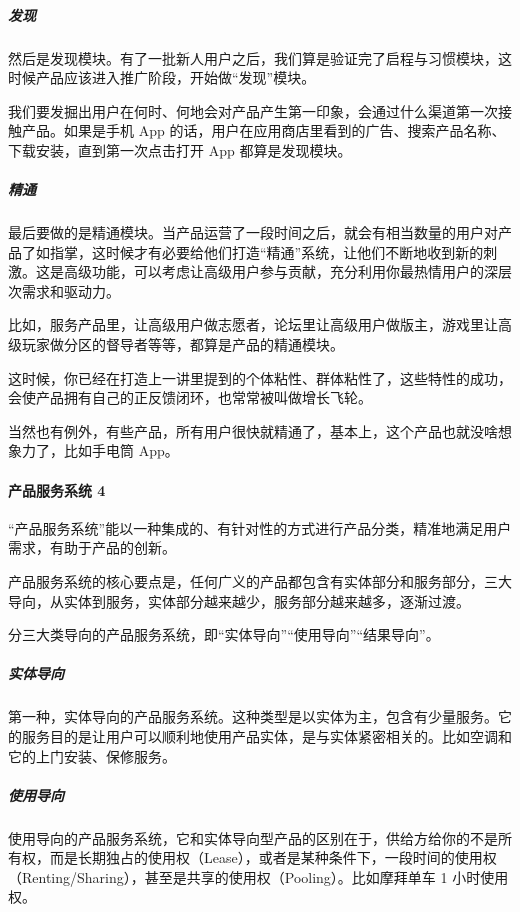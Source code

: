 \documentclass[letterpaper,11pt,english]{sphinxmanual}
\begin{document}
\subparagraph{发现}
\label{\detokenize{chapter_introduction/Product:id23}}
然后是发现模块。有了一批新人用户之后，我们算是验证完了启程与习惯模块，这时候产品应该进入推广阶段，开始做“发现”模块。

我们要发掘出用户在何时、何地会对产品产生第一印象，会通过什么渠道第一次接触产品。如果是手机
App
的话，用户在应用商店里看到的广告、搜索产品名称、下载安装，直到第一次点击打开
App 都算是发现模块。


\subparagraph{精通}
\label{\detokenize{chapter_introduction/Product:id24}}
最后要做的是精通模块。当产品运营了一段时间之后，就会有相当数量的用户对产品了如指掌，这时候才有必要给他们打造“精通”系统，让他们不断地收到新的刺激。这是高级功能，可以考虑让高级用户参与贡献，充分利用你最热情用户的深层次需求和驱动力。

比如，服务产品里，让高级用户做志愿者，论坛里让高级用户做版主，游戏里让高级玩家做分区的督导者等等，都算是产品的精通模块。

这时候，你已经在打造上一讲里提到的个体粘性、群体粘性了，这些特性的成功，会使产品拥有自己的正反馈闭环，也常常被叫做增长飞轮。

当然也有例外，有些产品，所有用户很快就精通了，基本上，这个产品也就没啥想象力了，比如手电筒
App。


\paragraph{产品服务系统 4\sphinxfootnotemark[7]}
\label{\detokenize{chapter_introduction/Product:id25}}%
\begin{footnotetext}[7]\sphinxAtStartFootnote
{}
%
\end{footnotetext}\ignorespaces 
“产品服务系统”能以一种集成的、有针对性的方式进行产品分类，精准地满足用户需求，有助于产品的创新。

产品服务系统的核心要点是，任何广义的产品都包含有实体部分和服务部分，三大导向，从实体到服务，实体部分越来越少，服务部分越来越多，逐渐过渡。

分三大类导向的产品服务系统，即“实体导向”“使用导向”“结果导向”。


\subparagraph{实体导向}
\label{\detokenize{chapter_introduction/Product:id26}}
第一种，实体导向的产品服务系统。这种类型是以实体为主，包含有少量服务。它的服务目的是让用户可以顺利地使用产品实体，是与实体紧密相关的。比如空调和它的上门安装、保修服务。


\subparagraph{使用导向}
\label{\detokenize{chapter_introduction/Product:id27}}
使用导向的产品服务系统，它和实体导向型产品的区别在于，供给方给你的不是所有权，而是长期独占的使用权（Lease），或者是某种条件下，一段时间的使用权（Renting/Sharing），甚至是共享的使用权（Pooling）。比如摩拜单车
1 小时使用权。
\end{document}
